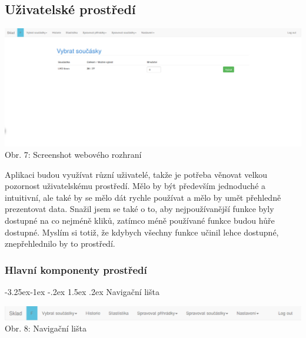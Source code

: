 \documentclass[12pt, a4paper, oneside]{article}
\makeatletter
\renewcommand\paragraph{\@startsection{paragraph}{4}{\z@}%
      {-3.25ex\@plus -1ex \@minus -.2ex}%
      {1.5ex \@plus .2ex}%
      {\normalfont\normalsize\bfseries}}
\makeatother
\begin{document}
\subsection{Uživatelské prostředí}

\begin{minipage}{\textwidth}
\begin{center}
\includegraphics[scale=0.31]{img/web.png}
\\
\caption{Obr. 7: Screenshot webového rozhraní}
\end{center}
\end{minipage}
\vspace{4mm}

Aplikaci budou využívat různí uživatelé, takže je potřeba věnovat velkou pozornost uživatelskému prostředí. Mělo by být především jednoduché a intuitivní, ale také by se mělo dát rychle používat a mělo by umět přehledně prezentovat data.
Snažil jsem se také o to, aby nejpoužívanější funkce byly dostupné na co nejméně kliků, zatímco méně používané funkce budou hůře dostupné. Myslím si totiž, že kdybych všechny funkce učinil
lehce dostupné, znepřehlednilo by to prostředí.

\subsubsection{Hlavní komponenty prostředí}

\paragraph{Navigační lišta}


\mbox{}
\begin{minipage}{\textwidth}
\begin{center}
\includegraphics[scale=0.5]{img/web_navbar.png}
\\
\caption{Obr. 8: Navigační lišta}
\end{center}
\end{minipage}
\vspace{4mm}
\end{document}

